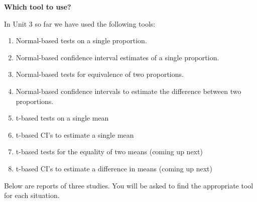 \def\theTopic{Reading 21 }

\begin{center}
{\large\bf  Which tool to use?}
\\
\end{center}

In Unit 3 so far we have used the following tools:
\begin{enumerate}
\item Normal-based tests on a single proportion.
\item Normal-based confidence interval estimates of a single proportion.
\item Normal-based tests for equivalence of two proportions.
\item Normal-based confidence intervals to estimate the difference
  between two proportions.
\item t-based tests on a single mean
\item t-based CI's to estimate a single mean
\item t-based tests for the equality of two means  (coming up next)
\item t-based CI's to estimate a difference in means (coming up next)
\end{enumerate}

Below are reports of three studies. You will be asked to find the
appropriate tool for each situation.

